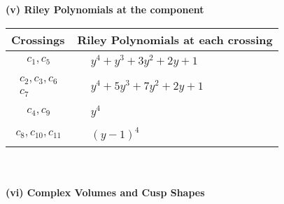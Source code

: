 \documentclass[1p]{elsarticle_modified}
\theoremstyle{definition}
\begin{document}
\newpage\renewcommand{\arraystretch}{1}
\flushleft \textbf{(v) Riley Polynomials at the component}\newline \\
\begin{tabular}{m{50pt}|m{274pt}}
Crossings & \hspace{64pt}Riley Polynomials at each crossing \\
\hline $$\begin{aligned}c_{1},c_{5}\end{aligned}$$&$\begin{aligned}
&y^4+y^3+3 y^2+2 y+1
\end{aligned}$\\
\hline $$\begin{aligned}c_{2},c_{3},c_{6}\\c_{7}\end{aligned}$$&$\begin{aligned}
&y^4+5 y^3+7 y^2+2 y+1
\end{aligned}$\\
\hline $$\begin{aligned}c_{4},c_{9}\end{aligned}$$&$\begin{aligned}
&y^4
\end{aligned}$\\
\hline $$\begin{aligned}c_{8},c_{10},c_{11}\end{aligned}$$&$\begin{aligned}
&(y-1)^4
\end{aligned}$\\
\hline
\end{tabular}\\~\\
\newpage\flushleft \textbf{(vi) Complex Volumes and Cusp Shapes}
\end{document}
